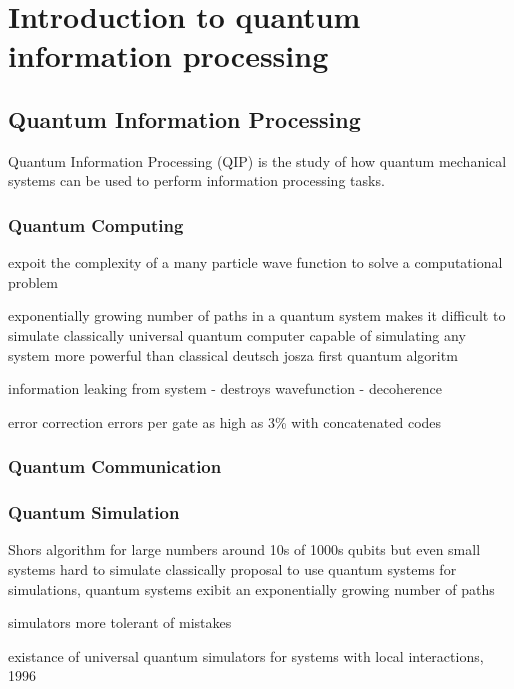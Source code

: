 \chapter{Introduction to quantum information processing} 
\label{ch:Introduction}

\section{Quantum Information Processing}

Quantum Information Processing (QIP) is the study of how quantum mechanical systems can be used to perform information processing tasks. 

\subsection{Quantum Computing}

expoit the complexity of a many particle wave function to solve a computational problem

\cite{feynman_82} exponentially growing number of paths in a quantum system makes it difficult to simulate classically
\cite{deutsch_85} universal quantum computer capable of simulating any system more powerful than classical
\cite{deutsch_jozsa_92} deutsch josza first quantum algoritm

\cite{shors_algorithm}

information leaking from system - destroys wavefunction - decoherence

error correction \cite{knill_correction} errors per gate as high as 3\% with concatenated codes
 
\cite{nature_cq_review_10}

\subsection{Quantum Communication}

\subsection{Quantum Simulation}
\cite{simulation_ion_review} Shors algorithm for large numbers around 10s of 1000s qubits
but even small systems hard to simulate classically
\cite{feynman_82} proposal to use quantum systems for simulations, quantum systems exibit an exponentially growing number of paths

simulators more tolerant of mistakes

\cite{lloyd_universal_simulators} existance of universal quantum simulators for systems with local interactions, 1996

